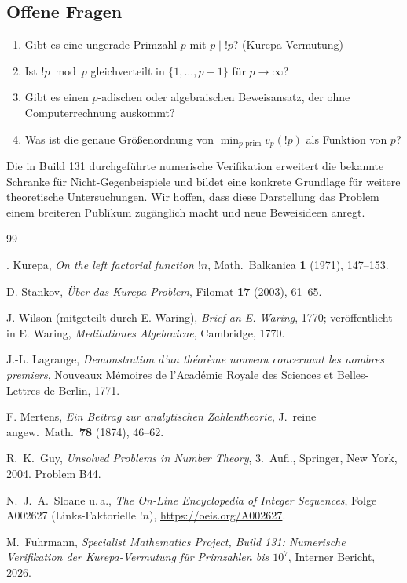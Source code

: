 \documentclass[12pt,a4paper]{amsart}
\theoremstyle{definition}
\begin{document}
\subsection*{Offene Fragen}
\begin{enumerate}
\item Gibt es eine ungerade Primzahl $p$ mit $p \mid !p$? (Kurepa-Vermutung)
\item Ist $!p \bmod p$ gleichverteilt in $\{1, \ldots, p-1\}$ für $p \to \infty$?
\item Gibt es einen $p$-adischen oder algebraischen Beweisansatz,
      der ohne Computerrechnung auskommt?
\item Was ist die genaue Größenordnung von $\min_{p \text{ prim}} v_p(!p)$
      als Funktion von $p$?
\end{enumerate}

Die in Build 131 durchgeführte numerische Verifikation erweitert die bekannte
Schranke für Nicht-Gegenbeispiele und bildet eine konkrete Grundlage für
weitere theoretische Untersuchungen.
Wir hoffen, dass diese Darstellung das Problem einem breiteren Publikum
zugänglich macht und neue Beweisideen anregt.

\begin{thebibliography}{99}

\DJ{}. Kurepa,
\textit{On the left factorial function $!n$},
Math.\ Balkanica \textbf{1} (1971), 147--153.

D. Stankov,
\textit{Über das Kurepa-Problem},
Filomat \textbf{17} (2003), 61--65.

J. Wilson (mitgeteilt durch E. Waring),
\textit{Brief an E. Waring},
1770; veröffentlicht in E. Waring, \textit{Meditationes Algebraicae},
Cambridge, 1770.

J.-L. Lagrange,
\textit{Demonstration d'un th\'eor\`eme nouveau concernant les nombres premiers},
Nouveaux M\'emoires de l'Acad\'emie Royale des Sciences et Belles-Lettres de Berlin,
1771.

F. Mertens,
\textit{Ein Beitrag zur analytischen Zahlentheorie},
J.\ reine angew.\ Math.\ \textbf{78} (1874), 46--62.

R.\ K.\ Guy,
\textit{Unsolved Problems in Number Theory}, 3.\ Aufl.,
Springer, New York, 2004.
Problem B44.

N.\ J.\ A.\ Sloane u.\,a.,
\textit{The On-Line Encyclopedia of Integer Sequences},
Folge A002627 (Links-Faktori\-elle $!n$),
\url{https://oeis.org/A002627}.

M.\ Fuhrmann,
\textit{Specialist Mathematics Project, Build 131: Numerische Verifikation der
Kurepa-Vermutung für Primzahlen bis $10^7$},
Interner Bericht, 2026.

\end{thebibliography}
\end{document}
